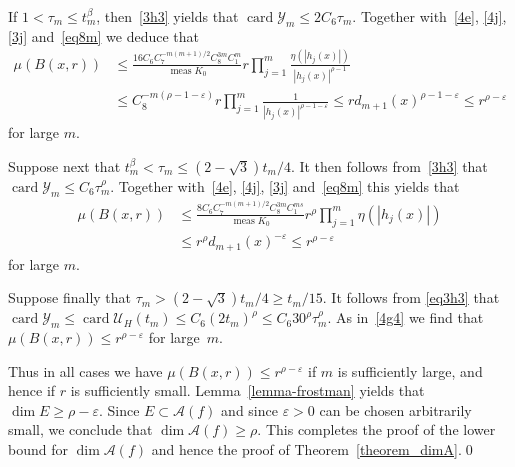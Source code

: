 \documentclass[12pt,a4paper]{amsart}
\theoremstyle{plain}
\theoremstyle{definition}
\theoremstyle{remark}
\def\cA{\mathcal A}
\def\cU{\mathcal U}
\def\cY{\mathcal Y}
\def\meas{\operatorname{meas}}
\def\card{\operatorname{card}}
\numberwithin{equation}{section}
\begin{document}
If $1<\tau_m\leq t_m^{\beta}$,
then~\eqref{3h3} yields that $\card \cY_m\leq 2C_6 \tau_m$.
Together with~\eqref{4e}, \eqref{4j}, \eqref{3j}  and~\eqref{eq8m} we deduce that
\begin{equation}\label{4g3}
\begin{aligned}
\mu(B(x,r))
&\leq 
\frac{16C_6 C_7^{-m(m+1)/2} C_8^{3m} C_1^m}{\meas K_0}
r \prod_{j=1}^m\frac{\eta(|h_j(x)|)}{|h_j(x)|^{\rho-1}} 
\\ &
\leq C_8^{-m(\rho-1-\varepsilon)} r \prod_{j=1}^m\frac{1}{|h_j(x)|^{\rho-1-\varepsilon}} 
\leq r d_{m+1}(x)^{\rho-1-\varepsilon}\leq r^{\rho-\varepsilon}
\end{aligned}
\end{equation}
for large $m$.

Suppose next that $t_m^{\beta}<\tau_m\leq (2-\sqrt{3})t_m/4$.
It then follows from~\eqref{3h3} that $\card \cY_m\leq C_6 \tau_m^\rho$.
Together with~\eqref{4e}, \eqref{4j}, \eqref{3j}  and~\eqref{eq8m} this yields that 
\begin{equation}\label{4g4}
\begin{aligned}
\mu(B(x,r))
&\leq 
\frac{8C_6 C_7^{-m(m+1)/2} C_8^{3m} C_1^{ms}}{\meas K_0} r^\rho \prod_{j=1}^m\eta(|h_j(x)|)
\\ &
\leq r^\rho d_{m+1}(x)^{-\varepsilon}\leq r^{\rho-\varepsilon}
\end{aligned}
\end{equation}
for large $m$.

Suppose finally that $\tau_m>(2-\sqrt{3})t_m/4\geq t_m/15$. It follows from \eqref{eq3h3} that  
 $\card \cY_m\leq \card\cU_H(t_m)\leq C_6(2t_m)^\rho\leq C_6 30^\rho\tau_m^\rho$.
As in~\eqref{4g4} we find that $\mu(B(x,r))\leq r^{\rho-\varepsilon}$ for large~$m$.

Thus in all cases we have $\mu(B(x,r))\leq r^{\rho-\varepsilon}$ if $m$ is 
sufficiently large, and hence if $r$ is sufficiently small.
Lemma~\ref{lemma-frostman} yields that $\dim E\geq \rho-\varepsilon$.
Since $E\subset \cA(f)$ and since $\varepsilon>0$ can be chosen arbitrarily small, 
we conclude that $\dim\cA(f)\geq \rho$.
This completes the proof of the lower bound for $\dim\cA(f)$ and hence the
proof of Theorem~\ref{theorem_dimA}.\qed
\end{document}
